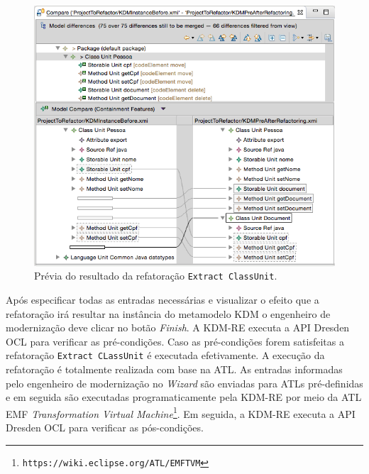 \begin{figure}[h]
	\centering
	\caption{Prévia do resultado da refatoração \texttt{Extract ClassUnit}.}
	\label{fig:previa_resultado_extractClassUnit}
	\includegraphics[scale=0.5]{images/previaRefatoracaoExtractClassUnitEMFCOmpare}
	\fautor
\end{figure}


Após especificar todas as entradas necessárias e visualizar o efeito que a refatoração irá resultar na instância do metamodelo KDM o engenheiro de modernização deve clicar no botão \textit{Finish}. A KDM-RE executa a API Dresden OCL para verificar as pré-condições. Caso as pré-condições forem satisfeitas a refatoração \texttt{Extract CLassUnit} é executada efetivamente. A execução da refatoração é totalmente realizada com base na ATL. As entradas informadas pelo engenheiro de modernização no \textit{Wizard} são enviadas para ATLs pré-definidas e em seguida são executadas programaticamente pela KDM-RE por meio da ATL EMF \textit{Transformation Virtual Machine}\footnote{\texttt{https://wiki.eclipse.org/ATL/EMFTVM}}. Em seguida, a KDM-RE  executa a API Dresden OCL para verificar as pós-condições. 


